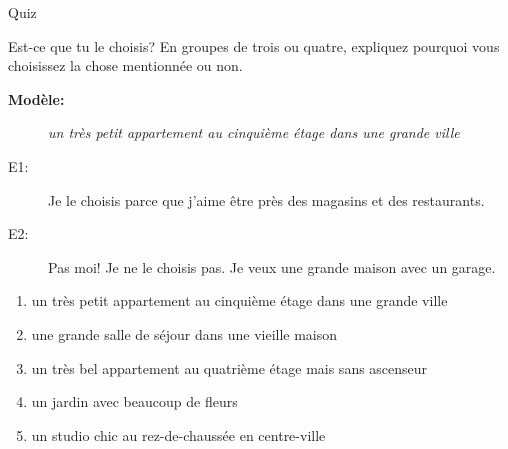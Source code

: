 \documentclass{beamer}
\begin{document}
  \begin{frame}{}
    \begin{center}
      \Large Quiz
    \end{center}
  \end{frame}

  \begin{frame}{Est-ce que tu le choisis?}
    \small
    En groupes de trois ou quatre, expliquez pourquoi vous choisissez la chose mentionnée ou non.
    \begin{description}
      \item[\textbf{Modèle:}] \emph{un très petit appartement au cinquième étage dans une grande ville}
      \item[E1:] Je le choisis parce que j'aime être près des magasins et des restaurants.
      \item[E2:] Pas moi! Je ne le choisis pas. Je veux une grande maison avec un garage.
    \end{description}
    \begin{enumerate}
      \item un très petit appartement au cinquième étage dans une grande ville
      \item une grande salle de séjour dans une vieille maison
      \item un très bel appartement au quatrième étage mais sans ascenseur
      \item un jardin avec beaucoup de fleurs
      \item un studio chic au rez-de-chaussée en centre-ville
    \end{enumerate}
  \end{frame}
\end{document}
